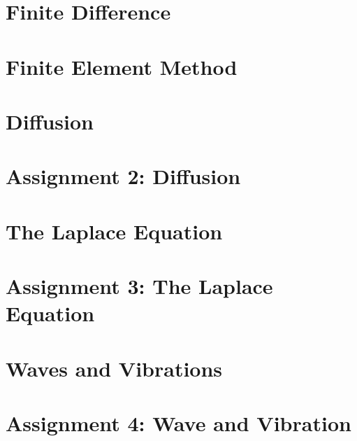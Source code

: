 \documentclass{article}
\begin{document}
\section{Finite Difference}

\clearpage

\section{Finite Element Method}

\clearpage

\section{Diffusion}

\clearpage

\section{Assignment 2: Diffusion}

\clearpage

\section{The Laplace Equation}

\clearpage

\section{Assignment 3: The Laplace Equation}

\clearpage

\section{Waves and Vibrations}

\clearpage

\section{Assignment 4: Wave and Vibration}

\clearpage



\end{document}
